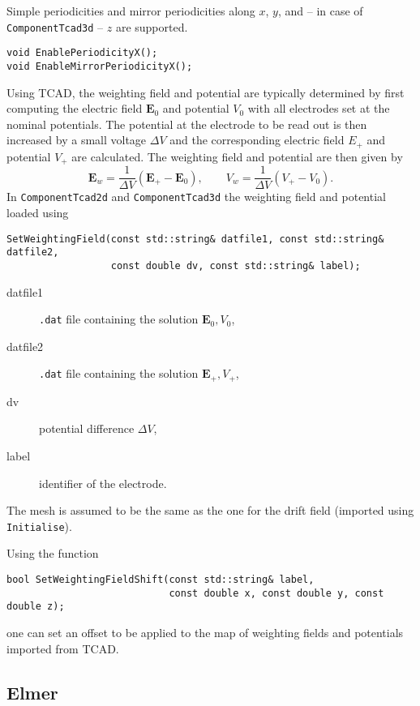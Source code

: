 Simple periodicities and mirror periodicities along 
\(x\), \(y\), and -- in case of \texttt{ComponentTcad3d} -- \(z\) 
are supported. 
\begin{lstlisting}
void EnablePeriodicityX();
void EnableMirrorPeriodicityX();
\end{lstlisting}

Using TCAD, the weighting field and potential are typically determined 
by first computing the electric field $\mathbf{E}_{0}$ and potential 
$V_{0}$ with all electrodes set at the nominal potentials.
The potential at the electrode to be read out is then increased by a 
small voltage $\Delta V$ and the corresponding electric field $E_{+}$ and 
potential $V_{+}$ are calculated. The weighting field and potential 
are then given by 
\begin{equation*}
  \mathbf{E}_{w} = \frac{1}{\Delta V}\left(\mathbf{E}_{+} - \mathbf{E}_{0}\right), \qquad V_{w} = \frac{1}{\Delta V}\left(V_{+} - V_{0}\right).
\end{equation*}
In \texttt{ComponentTcad2d} and \texttt{ComponentTcad3d} the weighting 
field and potential loaded using
\begin{lstlisting} 
SetWeightingField(const std::string& datfile1, const std::string& datfile2,
                  const double dv, const std::string& label); 
\end{lstlisting}
\begin{description}
  \item[datfile1] \texttt{.dat} file containing the solution $\mathbf{E}_0, V_0$,
  \item[datfile2] \texttt{.dat} file containing the solution $\mathbf{E}_+, V_+$,
  \item[dv] potential difference $\Delta V$,
  \item[label] identifier of the electrode.
\end{description}
The mesh is assumed to be the same as the one for the drift field 
(imported using \texttt{Initialise}).

Using the function
\begin{lstlisting}
bool SetWeightingFieldShift(const std::string& label,
                            const double x, const double y, const double z);
\end{lstlisting}
one can set an offset to be applied to the map of weighting fields and potentials imported from TCAD.

\subsection{Elmer}

